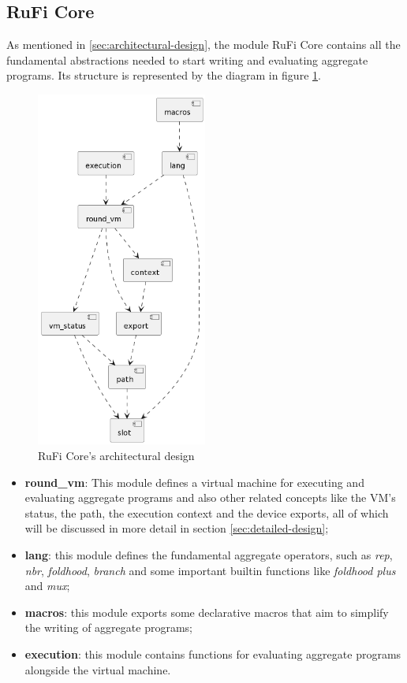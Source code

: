 \subsection{RuFi Core}
\label{subsec:rufi-core}
As mentioned in \ref{sec:architectural-design}, the module RuFi Core contains all the fundamental abstractions needed to start writing and evaluating aggregate programs.
Its structure is represented by the diagram in figure \ref{fig:rufi-core-architecture}.

\begin{figure}[ht!]
    \centering
    \includegraphics[width=0.5\textwidth]{figures/diagrams/img/rufi-core-architecture.png}
    \caption{RuFi Core's architectural design}
    \label{fig:rufi-core-architecture}
\end{figure}

\begin{itemize}
    \item \textbf{round\_vm}: This module defines a virtual machine for executing and evaluating aggregate programs and also other related concepts like the VM's status,
          the path, the execution context and the device exports, all of which will be discussed in more detail in section \ref{sec:detailed-design};
    \item \textbf{lang}: this module defines the fundamental aggregate operators, such as \textit{rep}, \textit{nbr}, \textit{foldhood}, \textit{branch} and some important builtin functions like \textit{foldhood plus} and \textit{mux};
    \item \textbf{macros}: this module exports some declarative macros that aim to simplify the writing of aggregate programs;\
    \item \textbf{execution}: this module contains functions for evaluating aggregate programs alongside the virtual machine.
\end{itemize}

